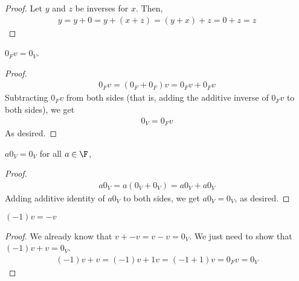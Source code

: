 \documentclass{article}
\begin{document}
  \begin{proof}
    Let $y$ and $z$ be inverses for $x$. Then,
    \begin{align*}
      y = y + 0 = y + (x + z) = (y + x) + z = 0 + z = z
    \end{align*}
  \end{proof}
  \begin{prop}
    $0_Fv = 0_V$.
  \end{prop}
  \begin{proof}
    \begin{align*}
      0_Fv = (0_F + 0_F)v = 0_Fv + 0_Fv
    \end{align*}
    Subtracting $0_Fv$ from both sides (that is, adding the additive inverse of $0_Fv$ to both sides), we get
    \begin{align*}
      0_V = 0_Fv
    \end{align*}
    As desired.
  \end{proof}
  \begin{prop}
    $a0_V = 0_V$ for all $a \in \F$,
  \end{prop}
  \begin{proof}
    \begin{align*}
      a0_V = a(0_V + 0_V) = a0_V + a0_V
    \end{align*}
    Adding additive identity of $a0_V$ to both sides, we get $a0_V = 0_V$, as desired.
  \end{proof}
  \begin{prop}
    $(-1)v = -v$
  \end{prop}
  \begin{proof}
    We already know that $v + -v = v - v = 0_V$. We just need to show that $(-1)v + v = 0_V$.
    \begin{align*}
      (-1)v + v = (-1)v + 1v = (-1 + 1)v = 0_Fv = 0_V
    \end{align*}
  \end{proof}
\end{document}
